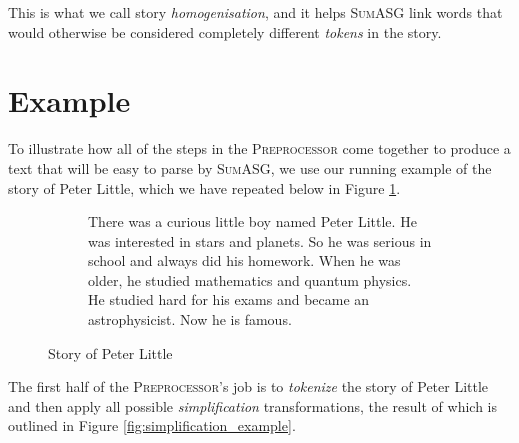 This is what we call story \textit{homogenisation}, and it helps \textsc{SumASG} link words that would otherwise be considered completely different \textit{tokens} in the story.

\section{Example}
\label{sec:preprocessor_example}

To illustrate how all of the steps in the \textsc{Preprocessor} come together to produce a text that will be easy to parse by \textsc{SumASG}, we use our running example of the story of Peter Little, which we have repeated below in Figure \ref{fig:peter_little_story}.

\begin{figure}[H]
\begin{subfigure}{\textwidth}
\begin{displayquote}
There was a curious little boy named Peter Little. He was interested in stars and planets. So he was serious in school and always did his homework. When he was older, he studied mathematics and quantum physics. He studied hard for his exams and became an astrophysicist. Now he is famous.
\end{displayquote}
\end{subfigure}
\caption{Story of Peter Little}
\label{fig:peter_little_story}
\end{figure}

\noindent
The first half of the \textsc{Preprocessor}'s job is to \textit{tokenize} the story of Peter Little and then apply all possible \textit{simplification} transformations, the result of which is outlined in Figure \ref{fig:simplification_example}.

